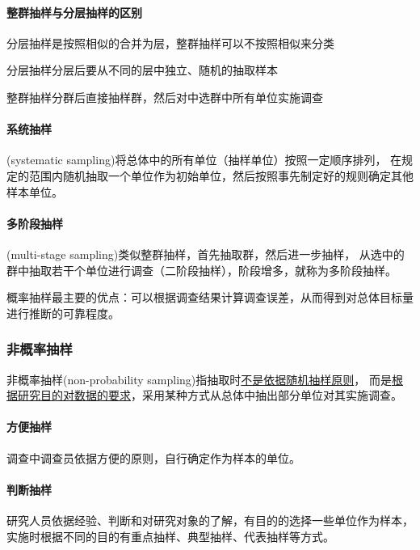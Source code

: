 \documentclass[UTF8,10pt]{book}
\begin{document}
    \paragraph{整群抽样与分层抽样的区别}
    
    分层抽样是按照相似的合并为层，整群抽样可以不按照相似来分类
    
    分层抽样分层后要从不同的层中独立、随机的抽取样本
    
    整群抽样分群后直接抽样群，然后对中选群中所有单位实施调查

    \paragraph{系统抽样}

    (systematic sampling)将总体中的所有单位（抽样单位）按照一定顺序排列，
    在规定的范围内随机抽取一个单位作为初始单位，然后按照事先制定好的规则确定其他样本单位。

    \paragraph{多阶段抽样}

    (multi-stage sampling)类似整群抽样，首先抽取群，然后进一步抽样，
    从选中的群中抽取若干个单位进行调查（二阶段抽样），阶段增多，就称为多阶段抽样。

    概率抽样最主要的优点：可以根据调查结果计算调查误差，从而得到对总体目标量进行推断的可靠程度。

    \subsubsection{非概率抽样}

    非概率抽样(non-probability sampling)指抽取时\underline{不是依据随机抽样原则}，
    而是\underline{根据研究目的对数据的要求}，采用某种方式从总体中抽出部分单位对其实施调查。
    
    \paragraph{方便抽样}

    调查中调查员依据方便的原则，自行确定作为样本的单位。

    \paragraph{判断抽样}

    研究人员依据经验、判断和对研究对象的了解，有目的的选择一些单位作为样本，
    实施时根据不同的目的有重点抽样、典型抽样、代表抽样等方式。
\end{document}
